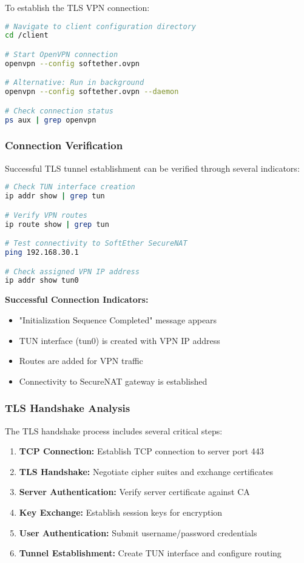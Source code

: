 To establish the TLS VPN connection:

\begin{lstlisting}[language=bash]
# Navigate to client configuration directory
cd /client

# Start OpenVPN connection
openvpn --config softether.ovpn

# Alternative: Run in background
openvpn --config softether.ovpn --daemon

# Check connection status
ps aux | grep openvpn
\end{lstlisting}

\subsubsection{Connection Verification}

Successful TLS tunnel establishment can be verified through several indicators:

\begin{lstlisting}[language=bash]
# Check TUN interface creation
ip addr show | grep tun

# Verify VPN routes
ip route show | grep tun

# Test connectivity to SoftEther SecureNAT
ping 192.168.30.1

# Check assigned VPN IP address
ip addr show tun0
\end{lstlisting}

\noindent
\textbf{Successful Connection Indicators:}
\begin{itemize}
    \item "Initialization Sequence Completed" message appears
    \item TUN interface (tun0) is created with VPN IP address
    \item Routes are added for VPN traffic
    \item Connectivity to SecureNAT gateway is established
\end{itemize}

\subsubsection{TLS Handshake Analysis}

The TLS handshake process includes several critical steps:

\begin{enumerate}
    \item \textbf{TCP Connection:} Establish TCP connection to server port 443
    \item \textbf{TLS Handshake:} Negotiate cipher suites and exchange certificates
    \item \textbf{Server Authentication:} Verify server certificate against CA
    \item \textbf{Key Exchange:} Establish session keys for encryption
    \item \textbf{User Authentication:} Submit username/password credentials
    \item \textbf{Tunnel Establishment:} Create TUN interface and configure routing
\end{enumerate}

